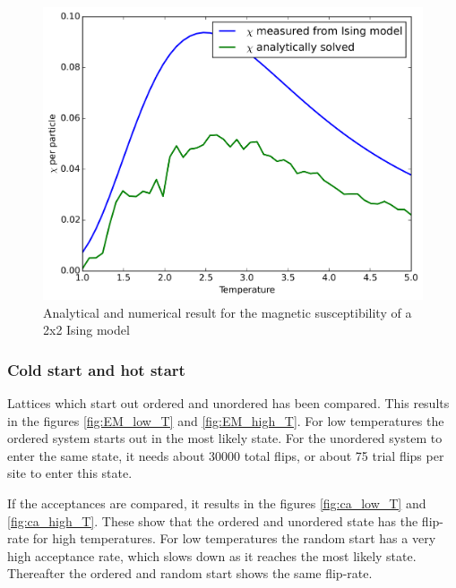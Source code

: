 \documentclass[11pt,a4paper,english,draft]{article}
\numberwithin{equation}{section}
\newcommand{\figurewidth}{.85\textwidth}
\begin{document}
\begin{figure}
\centering
\includegraphics[width=\figurewidth]{pics/achi.png}
\caption{Analytical and numerical result for the magnetic susceptibility
of a 2x2 Ising model}
\label{fig:achi}
\end{figure}







\subsubsection{Cold start and hot start}

Lattices which start out ordered and unordered has been compared. This 
results in the figures \ref{fig:EM_low_T} and \ref{fig:EM_high_T}. For low 
temperatures the ordered system starts out in the most likely state. For 
the unordered system to enter the same state, it needs about 30000 total 
flips, or about 75 trial flips per site to enter this state.

If the acceptances are compared, it 
results in the figures \ref{fig:ca_low_T} and \ref{fig:ca_high_T}.
These show that the ordered and unordered state has the flip-rate for 
high temperatures. For low temperatures the random start has a very high
acceptance rate, which slows down as it reaches the most likely state.
Thereafter the ordered and random start shows the same flip-rate.
\end{document}
